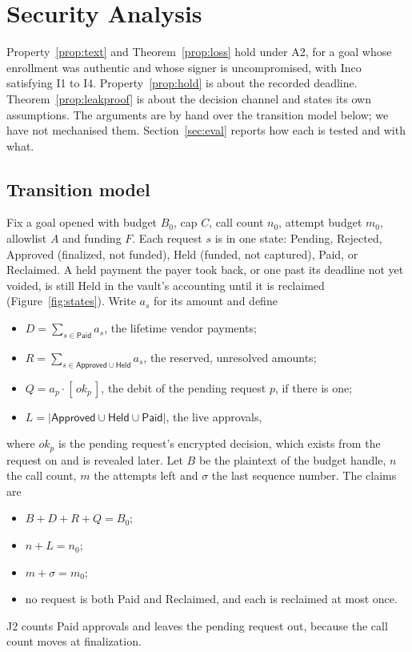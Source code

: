 \section{Security Analysis}
\label{sec:security}

Property~\ref{prop:text} and Theorem~\ref{prop:loss} hold under A2, for a goal whose enrollment was authentic and whose signer is
uncompromised, with Inco satisfying I1 to I4. Property~\ref{prop:hold} is about the recorded deadline. Theorem~\ref{prop:leakproof} is about
the decision channel and states its own assumptions. The arguments are by hand over the transition model below; we have not mechanised them.
Section~\ref{sec:eval} reports how each is tested and with what.

\subsection{Transition model}
\label{sec:model}

Fix a goal opened with budget $B_0$, cap $C$, call count $n_0$, attempt budget $m_0$, allowlist $A$ and funding $F$. Each request $s$ is in
one state: \textsf{Pending}, \textsf{Rejected}, \textsf{Approved} (finalized, not funded), \textsf{Held} (funded, not captured),
\textsf{Paid}, or \textsf{Reclaimed}. A held payment the payer took back, or one past its deadline not yet voided, is still \textsf{Held} in
the vault's accounting until it is reclaimed (Figure~\ref{fig:states}). Write $a_s$ for its amount and define
\begin{itemize}
  \item $D = \sum_{s \in \textsf{Paid}} a_s$, the lifetime vendor payments;
  \item $R = \sum_{s \in \textsf{Approved} \cup \textsf{Held}} a_s$, the reserved, unresolved amounts;
  \item $Q = a_p \cdot [\,\mathit{ok}_p\,]$, the debit of the pending request $p$, if there is one;
  \item $L = |\textsf{Approved} \cup \textsf{Held} \cup \textsf{Paid}|$, the live approvals,
\end{itemize}
where $\mathit{ok}_p$ is the pending request's encrypted decision, which exists from the request on and is revealed later. Let $B$ be the
plaintext of the budget handle, $n$ the call count, $m$ the attempts left and $\sigma$ the last sequence number. The claims are
\begin{itemize}
  \item[(J1)] $B + D + R + Q = B_0$;
  \item[(J2)] $n + L = n_0$;
  \item[(J3)] $m + \sigma = m_0$;
  \item[(J4)] no request is both \textsf{Paid} and \textsf{Reclaimed}, and each is reclaimed at most once.
\end{itemize}
J2 counts \textsf{Paid} approvals and leaves the pending request out, because the call count moves at finalization.

